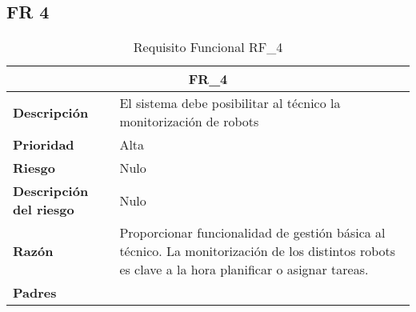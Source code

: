 \documentclass{scrreprt}
\begin{document}
\subsection{FR 4}
\begin{table}[H]
    \label{tab:my-table}
    
    \begin{tabular}{|p{5cm}|p{11cm}|}
    \hline
    \multicolumn{2}{|c|}{\textbf{FR_4}} \\
    \hline
    \textbf{Descripción  }                      & El sistema debe posibilitar al técnico la monitorización de robots                                                                            \\ \hline
    \textbf{Prioridad}                          & Alta                                                                                              \\ \hline
    \textbf{Riesgo}                          & Nulo                                                                                                \\ \hline
    \textbf{Descripción del riesgo}                    & Nulo                                                                               \\ \hline
    \textbf{Razón}                   & Proporcionar funcionalidad de gestión básica al técnico. La monitorización de los distintos robots es clave a la hora planificar o asignar tareas.                                                                                                \\ \hline
    \textbf{Padres}                               &  \\  \hline
    \end{tabular}%
    
    \caption{Requisito Funcional RF_4}
\end{table}
\end{document}
